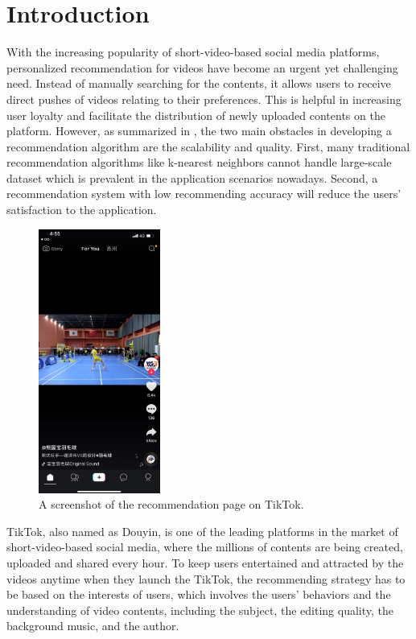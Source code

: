 \documentclass{article}
\begin{document}
\section{Introduction}
\label{sec:intro}

With the increasing popularity of short-video-based social media platforms, personalized recommendation for videos have become an urgent yet challenging need. Instead of manually searching for the contents, it allows users to receive direct pushes of videos relating to their preferences. This is helpful in increasing user loyalty and facilitate the distribution of newly uploaded contents on the platform.
However, as summarized in \cite{sarwar_item-based_2001}, the two main obstacles in developing a recommendation algorithm are the scalability and quality. First, many traditional recommendation algorithms like k-nearest neighbors cannot handle large-scale dataset which is prevalent in the application scenarios nowadays. Second, a recommendation system with low recommending accuracy will reduce the users' satisfaction to the application.

\begin{figure}[]
  \centering
  \includegraphics[width=4cm]{media/tiktok}
  \caption{A screenshot of the recommendation page on TikTok.}
  \label{fig:tiktok}
\end{figure}

TikTok, also named as Douyin, is one of the leading platforms in the market of short-video-based social media, where the millions of contents are being created, uploaded and shared every hour. To keep users entertained and attracted by the videos anytime when they launch the TikTok, the recommending strategy has to be based on the interests of users, which involves the users' behaviors and the understanding of video contents, including the subject, the editing quality, the background music, and the author.
\end{document}
